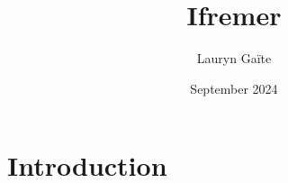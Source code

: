 \documentclass{article}
\title{Ifremer}
\author{Lauryn Gaïte}
\date{September 2024}
\begin{document}
\maketitle

\section{Introduction}
\end{document}
